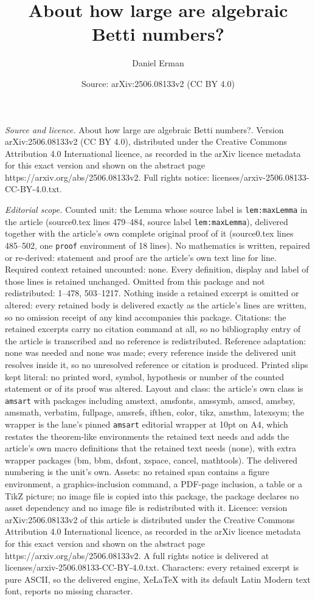 \documentclass[10pt,a4paper]{amsart}
\title[About how large are algebraic Betti numbers?]{About how large are algebraic Betti numbers?}
\author{Daniel Erman}
\date{Source: arXiv:2506.08133v2 (CC BY 4.0)}
\begin{document}
\maketitle

\noindent\emph{Source and licence.} About how large are algebraic Betti numbers?. Version arXiv:2506.08133v2 (CC BY 4.0), distributed under the Creative Commons Attribution 4.0 International licence, as recorded in the arXiv licence metadata for this exact version and shown on the abstract page https://arxiv.org/abs/2506.08133v2. Full rights notice: licenses/arxiv-2506.08133-CC-BY-4.0.txt.\par\smallskip

\noindent\textit{Editorial scope.} Counted unit: the Lemma whose source label is \texttt{lem:maxLemma} in the article (source0.tex lines 479--484, source label \texttt{lem:maxLemma}), delivered together with the article's own complete original proof of it (source0.tex lines 485--502, one \texttt{proof} environment of 18 lines). No mathematics is written, repaired or re-derived: statement and proof are the article's own text line for line. Required context retained uncounted: none. Every definition, display and label of those lines is retained unchanged. Omitted from this package and not redistributed: 1--478, 503--1217. Nothing inside a retained excerpt is omitted or altered: every retained body is delivered exactly as the article's lines are written, so no omission receipt of any kind accompanies this package. Citations: the retained excerpts carry no citation command at all, so no bibliography entry of the article is transcribed and no reference is redistributed. Reference adaptation: none was needed and none was made; every reference inside the delivered unit resolves inside it, so no unresolved reference or citation is produced. Printed slips kept literal: no printed word, symbol, hypothesis or number of the counted statement or of its proof was altered. Layout and class: the article's own class is \texttt{amsart} with packages including amstext, amsfonts, amssymb, amscd, amsbsy, amsmath, verbatim, fullpage, amsrefs, ifthen, color, tikz, amsthm, latexsym; the wrapper is the lane's pinned \texttt{amsart} editorial wrapper at 10pt on A4, which restates the theorem-like environments the retained text needs and adds the article's own macro definitions that the retained text needs (none), with extra wrapper packages (bm, bbm, dsfont, xspace, cancel, mathtools). The delivered numbering is the unit's own. Assets: no retained span contains a figure environment, a graphics-inclusion command, a PDF-page inclusion, a table or a TikZ picture; no image file is copied into this package, the package declares no asset dependency and no image file is redistributed with it. Licence: version arXiv:2506.08133v2 of this article is distributed under the Creative Commons Attribution 4.0 International licence, as recorded in the arXiv licence metadata for this exact version and shown on the abstract page https://arxiv.org/abs/2506.08133v2. A full rights notice is delivered at licenses/arxiv-2506.08133-CC-BY-4.0.txt. Characters: every retained excerpt is pure ASCII, so the delivered engine, XeLaTeX with its default Latin Modern text font, reports no missing character.
\end{document}
